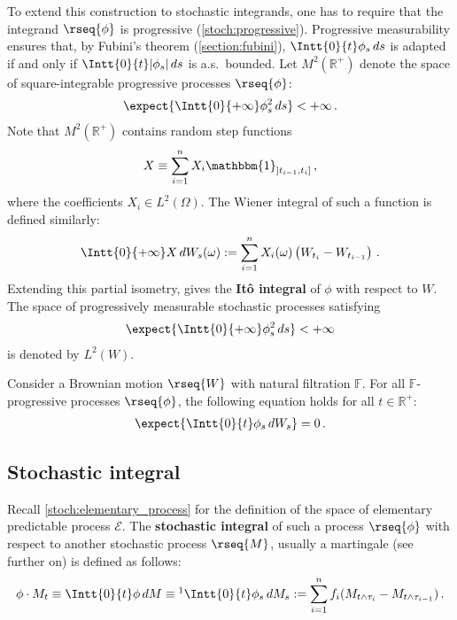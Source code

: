     To extend this construction to stochastic integrands, one has to require that the integrand $\rseq{\phi}$ is progressive (\cref{stoch:progressive}). Progressive measurability ensures that, by Fubini's theorem (\cref{section:fubini}), $\Intt{0}{t}\phi_s\,ds$ is adapted if and only if $\Intt{0}{t}|\phi_s|\,ds$ is a.s.~bounded. Let $M^2(\mathbb{R}^+)$ denote the space of square-integrable progressive processes $\rseq{\phi}$:
    \begin{gather}
        \expect{\Intt{0}{+\infty}\phi^2_s\,ds}<+\infty\,.
    \end{gather}
    Note that $M^2(\mathbb{R}^+)$ contains random step functions
    \begin{gather}
        X\equiv\sum_{i=1}^nX_i\mathbbm{1}_{]t_{i-1},t_i]}\,,
    \end{gather}
    where the coefficients $X_i\in L^2(\Omega)$. The Wiener integral of such a function is defined similarly:
    \begin{gather}
        \label{stoch:random_elementary_wiener_integral}
        \Intt{0}{+\infty}X\,dW_s(\omega) := \sum_{i=1}^nX_i(\omega)\left(W_{t_i} - W_{t_{i-1}}\right)\,.
    \end{gather}
    Extending this partial isometry, gives the \textbf{It\^o integral} of $\phi$ with respect to $W$. The space of progressively measurable stochastic processes satisfying
    \begin{gather}
        \expect{\Intt{0}{+\infty}\phi_s^2\,ds}<+\infty
    \end{gather}
    is denoted by $L^2(W)$.

    \begin{property}[Centrality]\label{stoch:wiener_integral_central}
        Consider a Brownian motion $\rseq{W}$ with natural filtration $\mathbb{F}$. For all $\mathbb{F}$-progressive processes $\rseq{\phi}$, the following equation holds for all $t\in\mathbb{R}^+$:
        \begin{gather}
            \expect{\Intt{0}{t}\phi_s\,dW_s} = 0\,.
        \end{gather}
    \end{property}

\subsection{Stochastic integral}

    Recall \cref{stoch:elementary_process} for the definition of the space of elementary predictable process $\mathcal{E}$. The \textbf{stochastic integral} of such a process $\rseq{\phi}$ with respect to another stochastic process $\rseq{M}$, usually a martingale (see further on) is defined as follows:
    \begin{gather}
        \label{stoch:elementary_integral}
        \phi\cdot M_t \equiv \Intt{0}{t}\phi\,dM \equiv\footnotemark \Intt{0}{t}\phi_s\,dM_s := \sum_{i=1}^nf_i(M_{t\land\tau_i} - M_{t\land\tau_{i-1}})\,.
    \end{gather}

